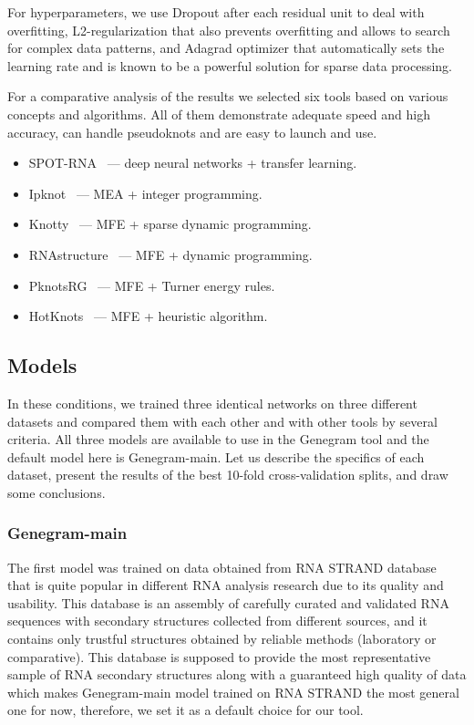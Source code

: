 For hyperparameters, we use Dropout after each residual unit to deal with overfitting, L2-regularization that also prevents overfitting and allows to search for complex data patterns, and Adagrad optimizer that automatically sets the learning rate and is known to be a powerful solution for sparse data processing.

For a comparative analysis of the results we selected six tools based on various concepts and algorithms. All of them demonstrate adequate speed and high accuracy, can handle pseudoknots and are easy to launch and use.

\begin{itemize}
    \item SPOT-RNA~\cite{singh2019rna} --- deep neural networks + transfer learning.
    \item Ipknot~\cite{sato2011ipknot} --- MEA + integer programming.
    \item Knotty~\cite{jabbari2018knotty} --- MFE + sparse dynamic programming.
    \item RNAstructure~\cite{bellaousov2013rnastructure} --- MFE + dynamic programming. 
    \item PknotsRG~\cite{reeder2007pknotsrg} --- MFE + Turner energy rules.
    \item HotKnots~\cite{ren2005hotknots} --- MFE + heuristic algorithm.
\end{itemize}

\subsection{Models}
In these conditions, we trained three identical networks on three different datasets and compared them with each other and with other tools by several criteria. All three models are available to use in the Genegram tool and the default model here is Genegram-main. Let us describe the specifics of each dataset, present the results of the best 10-fold cross-validation splits, and draw some conclusions.

\subsubsection{Genegram-main}
The first model was trained on data obtained from RNA STRAND database~\cite{andronescu2008rna} that is quite popular in different RNA analysis research due to its quality and usability. This database is an assembly of carefully curated and validated RNA sequences with secondary structures collected from different sources, and it contains only trustful structures obtained by reliable methods (laboratory or comparative). This database is supposed to provide the most representative sample of RNA secondary structures along with a guaranteed high quality of data which makes Genegram-main model trained on RNA STRAND the most general one for now, therefore, we set it as a default choice for our tool.

